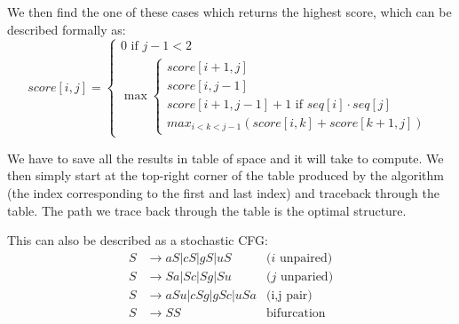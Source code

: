     We then find the one of these cases which returns the highest score, which 
    can be described formally as:
    \begin{equation*}
        score[i,j]=\begin{cases}
        0\text{ if }j-1<2\\
        \max\begin{cases}
        score[i+1,j]\\
        score[i, j-1]\\
        score[i+1, j-1]+1\text{ if }seq[i]\cdot seq[j]\\
        max_{i<k<j-1}(score[i,k]+score[k+1,j])
        \end{cases}
        \end{cases}
    \end{equation*}
    
    We have to save all the results in table of space  and it will 
    take  to compute. We then simply start at the top-right corner of 
    the table produced by the algorithm (the index corresponding to the first 
    and last index) and traceback through the table. The path we trace back 
    through the table is the optimal structure.
    
    This can also be described as a stochastic CFG:
    \begin{align*}
        S &\rightarrow aS|cS|gS|uS &\text{($i$ unpaired)}\\
        S &\rightarrow Sa|Sc|Sg|Su &\text{($j$ unparied)}\\
        S &\rightarrow aSu|cSg|gSc|uSa &\text{(i,j pair)}\\
        S &\rightarrow SS &\text{bifurcation}
    \end{align*}
    
